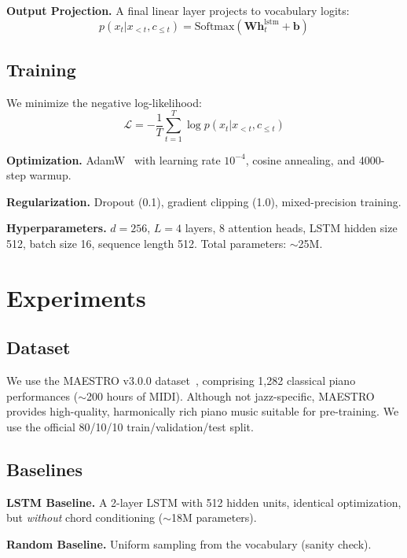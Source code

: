 \documentclass{article}
\begin{document}
\textbf{Output Projection.}
A final linear layer projects to vocabulary logits:
\begin{equation}
p(x_t | x_{<t}, c_{\leq t}) = \text{Softmax}(\mathbf{W} \mathbf{h}_t^{\text{lstm}} + \mathbf{b})
\end{equation}

\subsection{Training}

We minimize the negative log-likelihood:
\begin{equation}
\mathcal{L} = -\frac{1}{T} \sum_{t=1}^T \log p(x_t | x_{<t}, c_{\leq t})
\end{equation}

\textbf{Optimization.} AdamW~\cite{loshchilov2017adamw} with learning rate $10^{-4}$, cosine annealing, and 4000-step warmup.

\textbf{Regularization.} Dropout (0.1), gradient clipping (1.0), mixed-precision training.

\textbf{Hyperparameters.} $d=256$, $L=4$ layers, 8 attention heads, LSTM hidden size 512, batch size 16, sequence length 512.
Total parameters: $\sim$25M.

\section{Experiments}
\label{sec:experiments}

\subsection{Dataset}

We use the MAESTRO v3.0.0 dataset~\cite{hawthorne2018maestro}, comprising 1,282 classical piano performances ($\sim$200 hours of MIDI).
Although not jazz-specific, MAESTRO provides high-quality, harmonically rich piano music suitable for pre-training.
We use the official 80/10/10 train/validation/test split.

\subsection{Baselines}

\textbf{LSTM Baseline.}
A 2-layer LSTM with 512 hidden units, identical optimization, but \textit{without} chord conditioning ($\sim$18M parameters).

\textbf{Random Baseline.}
Uniform sampling from the vocabulary (sanity check).
\end{document}
